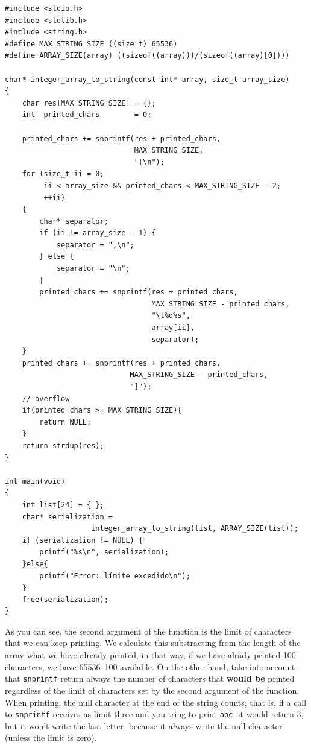 \documentclass[a4paper]{article}
\begin{document}
\noindent
\begin{minipage}[H]{\linewidth}
\mbox{}
\begin{lstlisting}[style=C,
caption={Ejemplo de uso de \texttt{snprintf}},
label={lst:snprintfExample}]
#include <stdio.h>
#include <stdlib.h>
#include <string.h>
#define MAX_STRING_SIZE ((size_t) 65536)
#define ARRAY_SIZE(array) ((sizeof((array)))/(sizeof((array)[0])))

char* integer_array_to_string(const int* array, size_t array_size)
{
    char res[MAX_STRING_SIZE] = {};
    int  printed_chars        = 0;

    printed_chars += snprintf(res + printed_chars,
                              MAX_STRING_SIZE,
                              "[\n");
    for (size_t ii = 0;
         ii < array_size && printed_chars < MAX_STRING_SIZE - 2;
         ++ii)
    {
        char* separator;
        if (ii != array_size - 1) {
            separator = ",\n";
        } else {
            separator = "\n";
        }
        printed_chars += snprintf(res + printed_chars,
                                  MAX_STRING_SIZE - printed_chars,
                                  "\t%d%s",
                                  array[ii],
                                  separator);
    }
    printed_chars += snprintf(res + printed_chars,
                             MAX_STRING_SIZE - printed_chars,
                             "]");
    // overflow
    if(printed_chars >= MAX_STRING_SIZE){
        return NULL;
    }
    return strdup(res);
}

int main(void)
{
    int list[24] = { };
    char* serialization =
                    integer_array_to_string(list, ARRAY_SIZE(list));
    if (serialization != NULL) {
        printf("%s\n", serialization);
    }else{
        printf("Error: límite excedido\n");
    }
    free(serialization);
}
\end{lstlisting}
\end{minipage}

As you can see, the second argument of the function is the limit of characters
that we can keep printing. We calculate this substracting from the length of the
array what we have already printed, in that way, if we have alrady printed
100 characters, we have 65536--100 available. On the other hand, take into
account that \verb!snprintf! return always the number of characters that
\textbf{would be} printed regardless of the limit of characters set by the
second argument of the function. When printing, the null character at the end
of the string counts, that is, if a call to \verb!snprintf! receives as limit
three and you tring to print \verb!abc!, it would return 3, but it won't write
the last letter, because it always write the null character (unless the limit
is zero).
\end{document}
